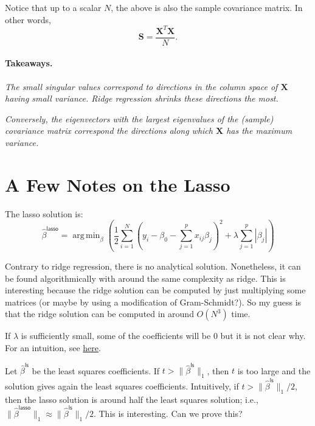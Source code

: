 \documentclass[11pt]{article}
\theoremstyle{definition}
\newcommand{\XX}{\mathbf{X}}
\renewcommand{\SS}{\mathbf{S}}
\newcommand{\lasso}{\textsf{lasso}}
\newcommand{\ls}{\textsf{ls}}
\DeclareMathOperator*{\argmin}{arg\,min} \DeclareMathOperator*{\Cov}{Cov}
\begin{document}
Notice that up to a scalar $N$, the above is also the sample covariance matrix.
In other words,
\[\SS=\frac{\XX^T\XX}{N}.\]

\paragraph{Takeaways.}
\begin{center}
	\emph{ The small singular values correspond to directions in the column
	space of $\XX$ having small variance. Ridge regression shrinks these
	directions the most.}
\end{center}

\begin{center}
	\emph{ Conversely, the eigenvectors with the largest eigenvalues of the
	(sample) covariance matrix correspond the directions along which $\XX$ has
	the maximum variance.}
\end{center}

\section{A Few Notes on the Lasso}
The lasso solution is:
\[
	\hat\beta^\lasso=\argmin_\beta \left(\frac{1}{2}\sum_{i=1}^N \left(y_i - \beta_0 - \sum_{j=1}^p x_{ij}\beta_j\right)^2 + \lambda\sum_{j=1}^p|\beta_j|\right)\]

Contrary to ridge regression, there is no analytical solution. Nonetheless, it
can be found algorithmically with around the same complexity as ridge. This is
interesting because the ridge solution can be computed by just multiplying some
matrices (or maybe by using a modification of Gram-Schmidt?). So my guess is
that the ridge solution can be computed in around $O(N^3)$ time.

If $\lambda$ is sufficiently small, some of the coefficients will be 0 but it is
not clear why. For an intuition, see
\href{https://stats.stackexchange.com/questions/74542/why-does-the-lasso-provide-variable-selection}{here}.

Let $\hat\beta^\ls$ be the least squares coefficients. If
$t>\|\hat\beta^\ls\|_1$, then $t$ is too large and the solution gives again the
least squares coefficients. Intuitively, if $t>\|\hat\beta^\ls\|_1/2$, then the
lasso solution is around half the least squares solution; i.e.,
$\|\hat\beta^\lasso\|_1 \approx \|\hat\beta^\ls\|_1/2$. This is interesting. Can
we prove this?
\end{document}
